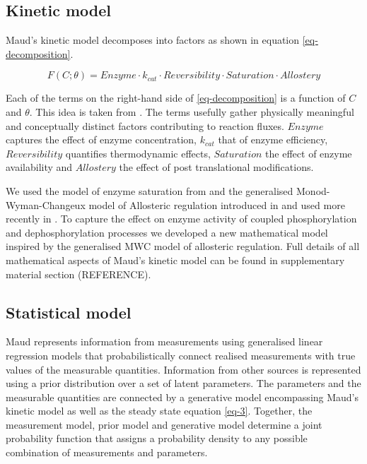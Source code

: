 \documentclass[journal=asbcd6,manuscript=article,layout=traditional]{achemso}
\begin{document}
\hypertarget{kinetic-model}{%
\subsection{Kinetic model}\label{kinetic-model}}

Maud's kinetic model decomposes into factors as shown in equation
\eqref{eq-decomposition}.

\begin{equation}
F(C;\theta) = Enzyme\cdot k_{cat}\cdot Reversibility \cdot Saturation \cdot Allostery \label{eq-decomposition}
\end{equation}

Each of the terms on the right-hand side of \eqref{eq-decomposition} is
a function of \(C\) and \(\theta\). This idea is taken from
\citet{noor_note_2013}. The terms usefully gather physically meaningful
and conceptually distinct factors contributing to reaction fluxes.
\(Enzyme\) captures the effect of enzyme concentration, \(k_{cat}\) that
of enzyme efficiency, \(Reversibility\) quantifies thermodynamic
effects, \(Saturation\) the effect of enzyme availability and
\(Allostery\) the effect of post translational modifications.

We used the model of enzyme saturation from
\citet{liebermeister_modular_2010} and the generalised
Monod-Wyman-Changeux model of Allosteric regulation introduced in
\citep{monod_nature_1965, changeux_2013, popova_generalization_1975, popova_description_1979}
and used more recently in \citet{matosGRASPComputationalPlatform2022}.
To capture the effect on enzyme activity of coupled phosphorylation and
dephosphorylation processes we developed a new mathematical model
inspired by the generalised MWC model of allosteric regulation. Full
details of all mathematical aspects of Maud's kinetic model can be found
in supplementary material section (REFERENCE).

\hypertarget{statistical-model}{%
\subsection{Statistical model}\label{statistical-model}}

Maud represents information from measurements using generalised linear
regression models that probabilistically connect realised measurements
with true values of the measurable quantities. Information from other
sources is represented using a prior distribution over a set of latent
parameters. The parameters and the measurable quantities are connected
by a generative model encompassing Maud's kinetic model as well as the
steady state equation \eqref{eq-3}. Together, the measurement model,
prior model and generative model determine a joint probability function
that assigns a probability density to any possible combination of
measurements and parameters.
\end{document}
